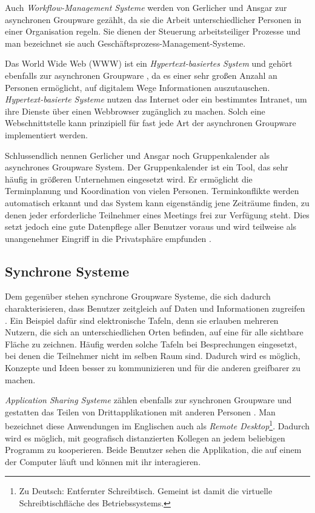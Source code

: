 Auch \emph{Workflow-Management Systeme} werden von Gerlicher und Ansgar \citep{Gerlicher:2007p241} zur asynchronen Groupware gezählt, da sie die Arbeit unterschiedlicher Personen in einer Organisation regeln. Sie dienen der Steuerung arbeitsteiliger Prozesse und man bezeichnet sie auch Geschäftsprozess-Management-Systeme.

Das World Wide Web (WWW) ist ein \emph{Hypertext-basiertes System} und gehört ebenfalls zur asynchronen Groupware \citep{Gerlicher:2007p241}, da es einer sehr großen Anzahl an Personen ermöglicht, auf digitalem Wege Informationen auszutauschen. \emph{Hypertext-basierte Systeme} nutzen das Internet oder ein bestimmtes Intranet, um ihre Dienste über einen Webbrowser zugänglich zu machen. Solch eine Webschnittstelle kann prinzipiell für fast jede Art der asynchronen Groupware implementiert werden. 

Schlussendlich nennen Gerlicher und Ansgar noch Gruppenkalender als asynchrones Groupware System. Der Gruppenkalender ist ein Tool, das sehr häufig in größeren Unternehmen eingesetzt wird. Er ermöglicht die Terminplanung und Koordination von vielen Personen. Terminkonflikte werden automatisch erkannt und das System kann eigenständig jene Zeiträume finden, zu denen jeder erforderliche Teilnehmer eines Meetings frei zur Verfügung steht. Dies setzt jedoch eine gute Datenpflege aller Benutzer voraus und wird teilweise als unangenehmer Eingriff in die Privatsphäre empfunden \citep{Gerlicher:2007p241}.

\subsection{Synchrone Systeme}

Dem gegenüber stehen synchrone Groupware Systeme, die sich dadurch charakterisieren, dass Benutzer zeitgleich auf Daten und Informationen zugreifen \citep{Gerlicher:2007p241}. Ein Beispiel dafür sind elektronische Tafeln, denn sie erlauben mehreren Nutzern, die sich an unterschiedlichen Orten befinden, auf eine für alle sichtbare Fläche zu zeichnen. Häufig werden solche Tafeln bei Besprechungen eingesetzt, bei denen die Teilnehmer nicht im selben Raum sind. Dadurch wird es möglich, Konzepte und Ideen besser zu kommunizieren und für die anderen greifbarer zu machen.

\emph{Application Sharing Systeme} zählen ebenfalls zur synchronen Groupware und gestatten das Teilen von Drittapplikationen mit anderen Personen \citep{Gerlicher:2007p241}. Man bezeichnet diese Anwendungen im Englischen auch als \emph{Remote Desktop}\footnote{Zu Deutsch: Entfernter Schreibtisch. Gemeint ist damit die virtuelle Schreibtischfläche des Betriebssystems.}. Dadurch wird es möglich, mit geografisch distanzierten Kollegen an jedem beliebigen Programm zu kooperieren. Beide Benutzer sehen die Applikation, die auf einem der Computer läuft und können mit ihr interagieren. 

